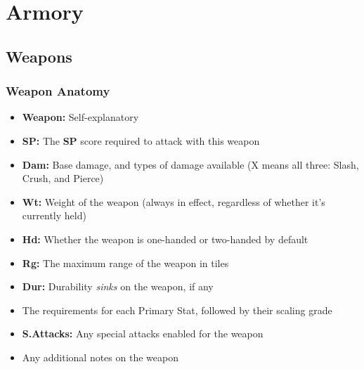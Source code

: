 \section{Armory}

\subsection{Weapons}
\subsubsection*{Weapon Anatomy}
\begin{itemize}
\item \textbf{Weapon:} Self-explanatory
\item \textbf{SP:} The \textbf{SP} score required to attack with this weapon
\item \textbf{Dam:} Base damage, and types of damage available (X means all three: Slash, Crush, and Pierce)
\item \textbf{Wt:} Weight of the weapon (always in effect, regardless of whether it’s currently held)
\item \textbf{Hd:} Whether the weapon is one-handed or two-handed by default
\item \textbf{Rg:} The maximum range of the weapon in tiles
\item \textbf{Dur:} Durability \emph{sinks} on the weapon, if any
\item The requirements for each Primary Stat, followed by their scaling grade
\item \textbf{S.Attacks:} Any special attacks enabled for the weapon
\item Any additional notes on the weapon
\end{itemize}

